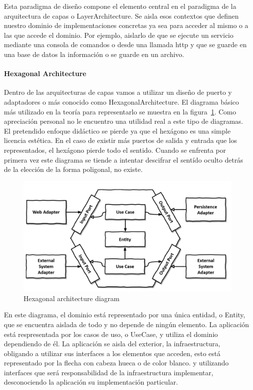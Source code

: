 Esta paradigma de diseño compone el elemento central en el paradigma de la arquitectura de capas o \gls{LayerArchitecture}. Se aisla esos contextos que definen nuestro dominio de implementaciones concretas ya sea para acceder al mismo o a las que accede el dominio. Por ejemplo, aislarlo de que se ejecute un servicio mediante una consola de comandos o desde una llamada http y que se guarde en una base de datos la información o se guarde en un archivo.

\paragraph{Hexagonal Architecture}

Dentro de las arquitecturas de capas vamos a utilizar un diseño de puerto y adaptadores o más conocido como \gls{HexagonalArchitecture}. El diagrama básico más utilizado en la teoría para representarlo se muestra en la figura~\cref{fig:hexagonalDiagram}. Como apreciación personal no le encuentro una utilidad real a este tipo de diagramas. El pretendido enfoque didáctico se pierde ya que el hexágono es una simple licencia estética. En el caso de existir más puertos de salida y entrada que los representados, el hexágono pierde todo el sentido. Cuando se enfrenta por primera vez este diagrama se tiende a intentar descifrar el sentído oculto detrás de la elección de la forma poligonal, no existe.

\begin{figure}[H]
    \centering
    \includegraphics[height=0.3\textheight]{./part/Ejecucion/Seguimiento/CreateTaskUseCase/img/HexagonalDiagram}
    \caption{Hexagonal architecture diagram\cite{TomHombergs2019GYHD}}\label{fig:hexagonalDiagram}
\end{figure}

En este diagrama, el dominio está representado por una única entidad, o Entity, que se encuentra aislada de todo y no depende de ningún elemento. La aplicación está respresentada por los casos de uso, o UseCase, y utiliza el dominio dependiendo de él. La aplicación se aisla del exterior, la infraestructura, obligando a utilizar sus interfaces a los elementos que acceden, esto está representado por la flecha con cabeza hueca o de color blanco. y utilizando interfaces que será responsabilidad de la infraestructura implementar, desconociendo la aplicación su implementación particular.

